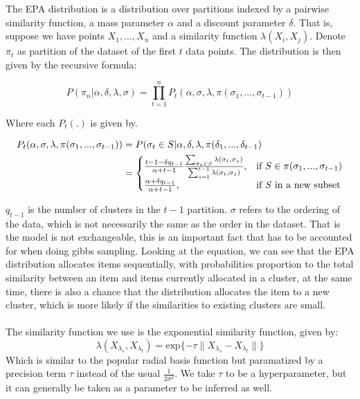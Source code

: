\documentclass{article}
\begin{document}
The EPA distribution is a distribution over partitions indexed by a pairwise similarity function, a mass parameter $\alpha$ and a discount parameter $\delta$. That is, suppose we have points $X_1,...,X_n$ and a similarity function $\lambda(X_i,X_j)$. Denote $\pi_t$ as partition of the dataset of the first $t$ data points. The distribution is then given by the recursive formula:

\begin{equation}
\label{eqn:EPA Distribution}
P(\pi_n| \alpha, \delta, \lambda, \sigma) = \prod_{t=1}^n P_t(\alpha, \sigma, \lambda, \pi(\sigma_1,...,\sigma_{t-1}))
\end{equation}

Where each $P_t(.)$ is given by.

\begin{equation}
\begin{align*}
    P_t(\alpha, \sigma, \lambda, \pi(\sigma_1,...,\sigma_{t-1})) &= P(\sigma_t \in S|\alpha, \delta,\lambda, \pi(\delta_1,...,\delta_{t-1}) \\
    &=\begin{cases}
    \frac{t-1-\delta q_{t-1}}{\alpha + t-1}\frac{\sum_{\sigma_s \in S}\lambda(\sigma_t,\sigma_s)}{\sum_{s=1}^{t-1}\lambda(\sigma_t,\sigma_s)}, & \text{if } S \in \pi(\sigma_1,...,\sigma_{t-1}) \\
     \frac{\alpha + \delta q_{t-1}}{\alpha+t-1}, & \text{if \emph{S} in a new subset}
    \end{cases} 
\end{align*}
\end{equation}

 $q_{t-1}$ is the number of clusters in the $t-1$ partition. $\sigma$ refers to the ordering of the data, which is not necessarily the same as the order in the dataset. That is the model is not exchangeable, this is an important fact that has to be accounted for when doing gibbs sampling. Looking at the equation, we can see that the EPA distribution allocates items sequentially, with probabilities proportion to the total similarity between an item and items currently allocated in a cluster, at the same time, there is also a chance that the distribution allocates the item to a new cluster, which is more likely if the similarities to existing clusters are small.
\\ \\
The similarity function we use is the exponential similarity function, given by:
\begin{equation}
    \lambda(X_{\lambda_s}, X_{\lambda_t}) = \text{exp}\{-\tau \lVert X_{\lambda_s} - X_{\lambda_t} \rVert  \}
\end{equation}
Which is similar to the popular radial basis function but paramatized by a precision term $\tau$ instead of the usual $\frac{1}{2\sigma^2}$. We take $\tau$ to be a hyperparameter, but it can generally be taken as a parameter to be inferred as well.
    
\end{document}
